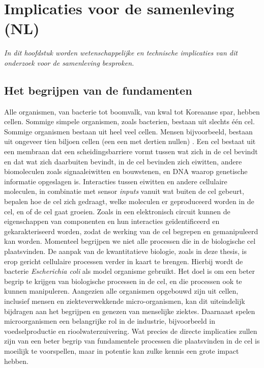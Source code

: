 
\chapter*{Implicaties voor de samenleving (NL)}


\textit{In dit hoofdstuk worden wetenschappelijke en technische implicaties van dit onderzoek voor de samenleving besproken.}

\section*{Het begrijpen van de fundamenten}

Alle organismen, van bacterie tot boomvalk, van kwal tot Koreaanse spar, hebben cellen.
%
Sommige simpele organismen, zoals bacterien, bestaan uit slechts één cel.
Sommige organismen bestaan uit heel veel cellen.
Mensen bijvoorbeeld, bestaan uit ongeveer tien biljoen cellen (een een met dertien nullen) \cite[BNID 102390]{Milo2010}.
%
Een cel bestaat uit een membraan dat 
een scheidingsbarriere vormt tussen wat zich in de cel bevindt en dat wat zich daarbuiten bevindt,
in de cel bevinden zich eiwitten, andere biomoleculen zoals signaaleiwitten en bouwstenen, en DNA waarop genetische informatie opgeslagen is.
%
Interacties tussen eiwitten en andere cellulaire moleculen, in combinatie met sensor \textit{inputs} vanuit wat buiten de cel gebeurt,
bepalen hoe de cel zich gedraagt, welke moleculen er geproduceerd worden in de cel, en of de cel gaat groeien.
%
Zoals in een elektronisch circuit kunnen de eigenschappen van componenten en hun interacties 
geïdentificeerd en gekarakteriseerd worden,
zodat de werking van de cel begrepen en gemanipuleerd kan worden.
%
Momenteel begrijpen we niet alle processen die in de biologische cel plaatsvinden.
%
De aanpak van de kwantitatieve biologie, zoals in deze thesis,
is erop gericht cellulaire processen verder in kaart te brengen.
Hierbij wordt de bacterie \textit{Escherichia coli} als model organisme gebruikt.
%
Het doel is om een beter begrip te krijgen van biologische processen in de cel, 
en die processen ook te kunnen manipuleren.
%
Aangezien alle organismen opgebouwd zijn uit cellen,
inclusief mensen en ziekteverwekkende micro-organismen, 
kan dit uiteindelijk bijdragen aan het begrijpen en genezen van menselijke ziektes.
%
Daarnaast spelen microorganismen een belangrijke rol in de industrie,
bijvoorbeeld in voedselproductie en rioolwaterzuivering.
%
Wat precies de directe implicaties zullen zijn van een beter begrip van fundamentele processen die plaatsvinden in de cel is moeilijk te voorspellen,
maar in potentie kan zulke kennis een grote impact hebben. 

